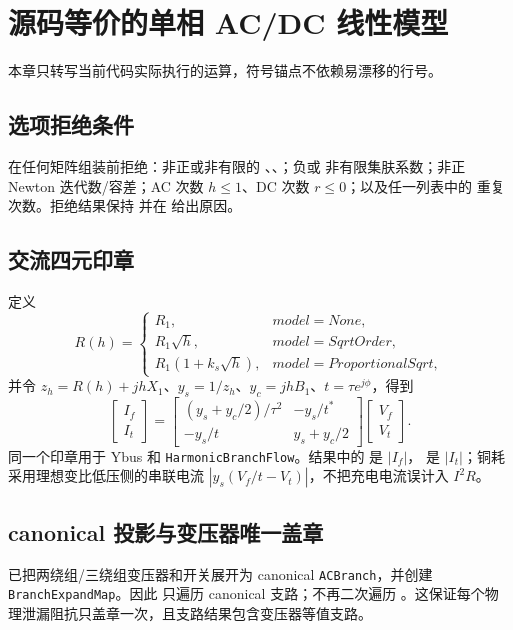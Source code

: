 \section{源码等价的单相 AC/DC 线性模型}
本章只转写当前代码实际执行的运算，符号锚点不依赖易漂移的行号。

\subsection{选项拒绝条件}
 在任何矩阵组装前拒绝：非正或非有限的
、、；负或
非有限集肤系数；非正 Newton 迭代数/容差；AC 次数 $h\le1$、DC 次数 $r\le0$；以及任一列表中的
重复次数。拒绝结果保持  并在  给出原因。

\subsection{交流四元印章}
 定义
\begin{equation}
R(h)=\begin{cases}R_1,&model=None,\\R_1\sqrt h,&model=SqrtOrder,\\
R_1(1+k_s\sqrt h),&model=ProportionalSqrt,
\end{cases}
\end{equation}
并令 $z_h=R(h)+jhX_1$、$y_s=1/z_h$、$y_c=jhB_1$、$t=\tau e^{j\phi}$，得到
\begin{equation}
\begin{bmatrix}I_f\\I_t\end{bmatrix}=
\begin{bmatrix}(y_s+y_c/2)/\tau^2&-y_s/t^*\\-y_s/t&y_s+y_c/2\end{bmatrix}
\begin{bmatrix}V_f\\V_t\end{bmatrix}.
\end{equation}
同一个印章用于 Ybus 和 \texttt{HarmonicBranchFlow}。结果中的  是 $|I_f|$，
 是 $|I_t|$；铜耗采用理想变比低压侧的串联电流
$|y_s(V_f/t-V_t)|$，不把充电电流误计入 $I^2R$。

\subsection{canonical 投影与变压器唯一盖章}
 已把两绕组/三绕组变压器和开关展开为
canonical \texttt{ACBranch}，并创建 \texttt{BranchExpandMap}。因此
 只遍历 canonical 支路；不再二次遍历
。这保证每个物理泄漏阻抗只盖章一次，且支路结果包含变压器等值支路。

